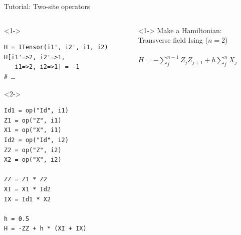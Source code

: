 \begin{frame}[fragile]{Tutorial: Two-site operators}

\begin{columns}

\begin{column}{4.5cm}

\begin{onlyenv}<1->
\begin{lstlisting}[language=JuliaLocal, style=julia, basicstyle=\scriptsize\ttfamily]
H = ITensor(i1', i2', i1, i2)
H[i1'=>2, i2'=>1,
   i1=>2, i2=>1] = -1
# …
\end{lstlisting}
\end{onlyenv}

\begin{onlyenv}<2->
\begin{lstlisting}[language=JuliaLocal, style=julia, basicstyle=\scriptsize\ttfamily]
Id1 = op("Id", i1)
Z1 = op("Z", i1)
X1 = op("X", i1)
Id2 = op("Id", i2)
Z2 = op("Z", i2)
X2 = op("X", i2)

ZZ = Z1 * Z2
XI = X1 * Id2
IX = Id1 * X2

h = 0.5
H = -ZZ + h * (XI + IX)
\end{lstlisting}
\end{onlyenv}

\end{column}

\begin{column}{5.5cm}

\begin{onlyenv}<1->
Make a Hamiltonian: \\
Transverse field Ising ($n=2$) \\
~\\
$H = -\sum_j^{n-1} Z_j Z_{j+1} + h \sum_j^n X_j$
\end{onlyenv}



\end{column}
\end{columns}
\end{frame}
